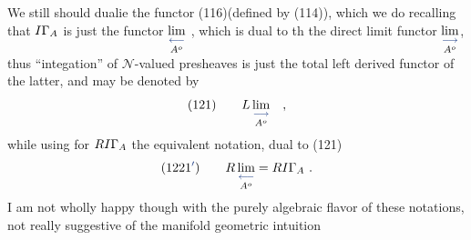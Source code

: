 \documentclass[10pt,oneside]{book}
\newcommand{\hand}[1]{{\ifnum\EditionMode=2\color{black}\else\color{PSHand}\fi #1}}
\let\over\relax
\newcommand{\xout}[1]{{\color{PSTypedOld}\ifmmode\text{[x: }#1\text{]}\else[\textsf{x:} #1]\fi}}
\begin{document}
We still should duali\over[typed]{z}{s}e the functor \inserted[typed]{$R\over{I}{\Gamma}_A$} (116)(defined by (114)), which
we do recalling that $\over{I}{\Gamma}_A$ is just the  functor $\underset{A^o}{\underset{\hand{\longleftarrow}}{\lim}}$ , which is dual to \xout{th}
the direct limit functor $\underset{A^o}{\underset{\hand{\longrightarrow}}{\lim}}$, thus ``integ\over[typed]{g}{r}ation'' of \hand{$\mathcal{N}$}-valued
presheaves is just  the total left derived functor of the latter, and
may be denoted by
\[ (121)\qquad L\,\underset{A^o}{\underset{\hand{\longrightarrow}}{\lim}} \quad , \]
while using for $R\over{I}{\Gamma}_A$ the equivalent notation, dual to (121)
\[ (12\over{2}{1}\hand{'})\qquad R\,\underset{A^o}{\underset{\hand{\longleftarrow}}{\lim}} = R\over{I}{\Gamma}_A \ . \]
I am not wholly happy though with the purely algebraic flavor of these
notations, not really suggestive of the manifold geometric intuition

\end{document}
